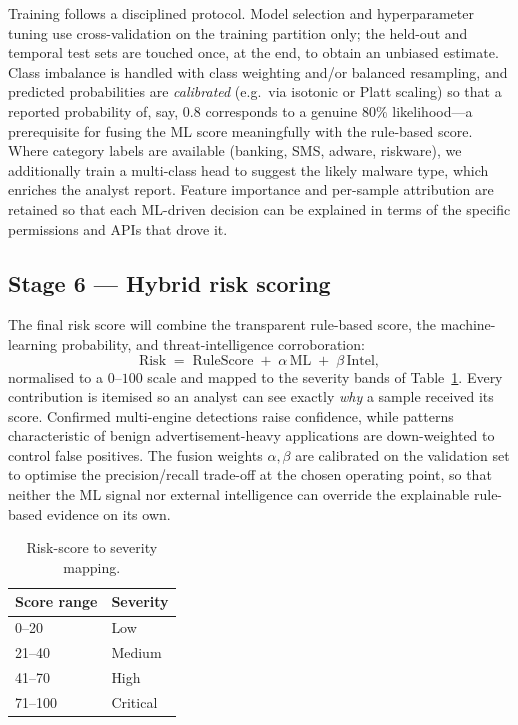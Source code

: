 \documentclass[11pt,a4paper]{article}
\begin{document}
Training follows a disciplined protocol. Model selection and hyperparameter tuning use
cross-validation on the training partition only; the held-out and temporal test sets are
touched once, at the end, to obtain an unbiased estimate. Class imbalance is handled with
class weighting and/or balanced resampling, and predicted probabilities are
\emph{calibrated} (e.g.\ via isotonic or Platt scaling) so that a reported probability of,
say, $0.8$ corresponds to a genuine $80\%$ likelihood---a prerequisite for fusing the ML
score meaningfully with the rule-based score. Where category labels are available
(banking, SMS, adware, riskware), we additionally train a multi-class head to suggest the
likely malware type, which enriches the analyst report. Feature importance and per-sample
attribution are retained so that each ML-driven decision can be explained in terms of the
specific permissions and APIs that drove it.

\subsection{Stage 6 --- Hybrid risk scoring}
The final risk score will combine the transparent rule-based score, the machine-learning
probability, and threat-intelligence corroboration:
\[
\mathrm{Risk} \;=\; \mathrm{RuleScore} \;+\; \alpha\,\mathrm{ML} \;+\; \beta\,\mathrm{Intel},
\]
normalised to a $0$--$100$ scale and mapped to the severity bands of
Table~\ref{tab:severity}. Every contribution is itemised so an analyst can see exactly
\emph{why} a sample received its score. Confirmed multi-engine detections raise
confidence, while patterns characteristic of benign advertisement-heavy applications are
down-weighted to control false positives. The fusion weights $\alpha,\beta$ are calibrated
on the validation set to optimise the precision/recall trade-off at the chosen operating
point, so that neither the ML signal nor external intelligence can override the
explainable rule-based evidence on its own.

\begin{table}[h]
\centering
\begin{tabular}{ll}
\toprule
\textbf{Score range} & \textbf{Severity}\\
\midrule
0--20 & Low\\
21--40 & Medium\\
41--70 & High\\
71--100 & Critical\\
\bottomrule
\end{tabular}
\caption{Risk-score to severity mapping.}
\label{tab:severity}
\end{table}
\end{document}
